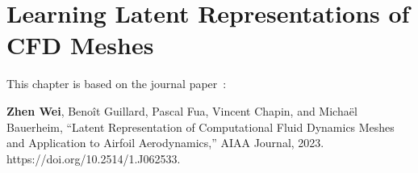 \chapter{Learning Latent Representations of CFD Meshes}
\label{ch3}
This chapter is based on the journal paper~\cite{aa.Wei2023}:

\textbf{Zhen Wei}, Benoît Guillard, Pascal Fua, Vincent Chapin, and Michaël Bauerheim, “Latent Representation of Computational Fluid Dynamics Meshes and Application to Airfoil Aerodynamics,” AIAA Journal, 2023. https://doi.org/10.2514/1.J062533.

%







